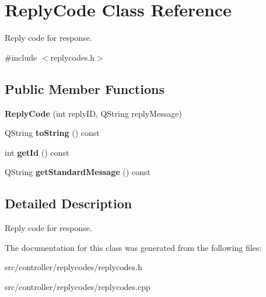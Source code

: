 \hypertarget{classReplyCode}{}\section{Reply\+Code Class Reference}
\label{classReplyCode}


Reply code for response.  




{\ttfamily \#include $<$replycodes.\+h$>$}

\subsection*{Public Member Functions}
\begin{DoxyCompactItemize}
\item 
\mbox{\label{classReplyCode_a82f0e1388581f48b76e4b8e6ac1bc525}} 
{\bfseries Reply\+Code} (int reply\+ID, Q\+String reply\+Message)
\item 
\mbox{\label{classReplyCode_ab749b423187ff7ec5facd725ec60a8db}} 
Q\+String {\bfseries to\+String} () const
\item 
\mbox{\label{classReplyCode_af8ff99881fcd22d26ef827103f3080f8}} 
int {\bfseries get\+Id} () const
\item 
\mbox{\label{classReplyCode_a4862f4305c6a76bf1ca07e309979bd11}} 
Q\+String {\bfseries get\+Standard\+Message} () const
\end{DoxyCompactItemize}


\subsection{Detailed Description}
Reply code for response. 

The documentation for this class was generated from the following files\+:\begin{DoxyCompactItemize}
\item 
src/controller/replycodes/replycodes.\+h\item 
src/controller/replycodes/replycodes.\+cpp\end{DoxyCompactItemize}
